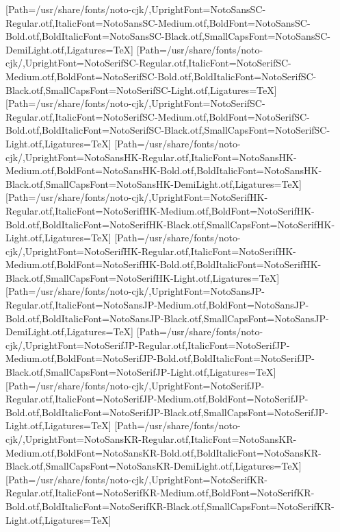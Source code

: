 \newfontfamily{}[Path=/usr/share/fonts/noto-cjk/,UprightFont=NotoSansSC-Regular.otf,ItalicFont=NotoSansSC-Medium.otf,BoldFont=NotoSansSC-Bold.otf,BoldItalicFont=NotoSansSC-Black.otf,SmallCapsFont=NotoSansSC-DemiLight.otf,Ligatures=TeX]
\newfontfamily{}[Path=/usr/share/fonts/noto-cjk/,UprightFont=NotoSerifSC-Regular.otf,ItalicFont=NotoSerifSC-Medium.otf,BoldFont=NotoSerifSC-Bold.otf,BoldItalicFont=NotoSerifSC-Black.otf,SmallCapsFont=NotoSerifSC-Light.otf,Ligatures=TeX]
\newfontfamily{}[Path=/usr/share/fonts/noto-cjk/,UprightFont=NotoSerifSC-Regular.otf,ItalicFont=NotoSerifSC-Medium.otf,BoldFont=NotoSerifSC-Bold.otf,BoldItalicFont=NotoSerifSC-Black.otf,SmallCapsFont=NotoSerifSC-Light.otf,Ligatures=TeX]
\newfontfamily{}[Path=/usr/share/fonts/noto-cjk/,UprightFont=NotoSansHK-Regular.otf,ItalicFont=NotoSansHK-Medium.otf,BoldFont=NotoSansHK-Bold.otf,BoldItalicFont=NotoSansHK-Black.otf,SmallCapsFont=NotoSansHK-DemiLight.otf,Ligatures=TeX]
\newfontfamily{}[Path=/usr/share/fonts/noto-cjk/,UprightFont=NotoSerifHK-Regular.otf,ItalicFont=NotoSerifHK-Medium.otf,BoldFont=NotoSerifHK-Bold.otf,BoldItalicFont=NotoSerifHK-Black.otf,SmallCapsFont=NotoSerifHK-Light.otf,Ligatures=TeX]
\newfontfamily{}[Path=/usr/share/fonts/noto-cjk/,UprightFont=NotoSerifHK-Regular.otf,ItalicFont=NotoSerifHK-Medium.otf,BoldFont=NotoSerifHK-Bold.otf,BoldItalicFont=NotoSerifHK-Black.otf,SmallCapsFont=NotoSerifHK-Light.otf,Ligatures=TeX]
\newfontfamily{}[Path=/usr/share/fonts/noto-cjk/,UprightFont=NotoSansJP-Regular.otf,ItalicFont=NotoSansJP-Medium.otf,BoldFont=NotoSansJP-Bold.otf,BoldItalicFont=NotoSansJP-Black.otf,SmallCapsFont=NotoSansJP-DemiLight.otf,Ligatures=TeX]
\newfontfamily{}[Path=/usr/share/fonts/noto-cjk/,UprightFont=NotoSerifJP-Regular.otf,ItalicFont=NotoSerifJP-Medium.otf,BoldFont=NotoSerifJP-Bold.otf,BoldItalicFont=NotoSerifJP-Black.otf,SmallCapsFont=NotoSerifJP-Light.otf,Ligatures=TeX]
\newfontfamily{}[Path=/usr/share/fonts/noto-cjk/,UprightFont=NotoSerifJP-Regular.otf,ItalicFont=NotoSerifJP-Medium.otf,BoldFont=NotoSerifJP-Bold.otf,BoldItalicFont=NotoSerifJP-Black.otf,SmallCapsFont=NotoSerifJP-Light.otf,Ligatures=TeX]
\newfontfamily{}[Path=/usr/share/fonts/noto-cjk/,UprightFont=NotoSansKR-Regular.otf,ItalicFont=NotoSansKR-Medium.otf,BoldFont=NotoSansKR-Bold.otf,BoldItalicFont=NotoSansKR-Black.otf,SmallCapsFont=NotoSansKR-DemiLight.otf,Ligatures=TeX]
\newfontfamily{}[Path=/usr/share/fonts/noto-cjk/,UprightFont=NotoSerifKR-Regular.otf,ItalicFont=NotoSerifKR-Medium.otf,BoldFont=NotoSerifKR-Bold.otf,BoldItalicFont=NotoSerifKR-Black.otf,SmallCapsFont=NotoSerifKR-Light.otf,Ligatures=TeX]
